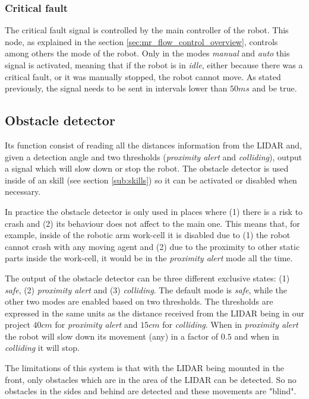 		\subsubsection{Critical fault} %
		\label{ssub:mr_critical_fault}
		The critical fault signal is controlled by the main controller of the robot.
		This node, as explained in the section \ref{sec:mr_flow_control_overview}, controls among others the mode of the robot.
		Only in the modes \emph{manual} and \emph{auto} this signal is 
		activated, meaning that if the robot is in \emph{idle}, either because 
		there was a critical fault, or it was manually stopped, the robot 
		cannot move.
		As stated previously, the signal needs to be sent in intervals lower 
		than $50ms$ and be true.

	\subsection{Obstacle detector} %
	\label{sub:mr_obstacle_detector}
	Its function consist of reading all the distances information from the LIDAR and, given a detection angle and two thresholds (\emph{proximity alert} and \emph{colliding}), output a signal which will slow down or stop the robot.
	The obstacle detector is used inside of an skill (see section \ref{sub:skills}) so it can be activated or disabled when necessary.

	In practice the obstacle detector is only used in places where (1) there is 
	a risk to crash and (2) its behaviour does not affect to the main one.
	This means that, for example, inside of the robotic arm work-cell it is disabled due to (1) the robot cannot crash with any moving agent and (2) due to the proximity to other static parts inside the work-cell, it would be in the \emph{proximity alert} mode all the time. 


	The output of the obstacle detector can be three different exclusive states: (1) \emph{safe}, (2) \emph{proximity alert} and (3) \emph{colliding}. 
	The default mode is \emph{safe}, while the other two modes are enabled based on two thresholds.
	The thresholds are expressed in the same units as the distance received from the LIDAR being in our project $40cm$ for \emph{proximity alert} and $15cm$ for \emph{colliding}.
	When in \emph{proximity alert} the robot will slow down its movement (any) in a factor of $0.5$ and when in \emph{colliding} it will stop.

	The limitations of this system is that with the LIDAR being mounted in the front, only obstacles which are in the area of the LIDAR can be detected.
	So no obstacles in the sides and behind are detected and these movements are "blind".
